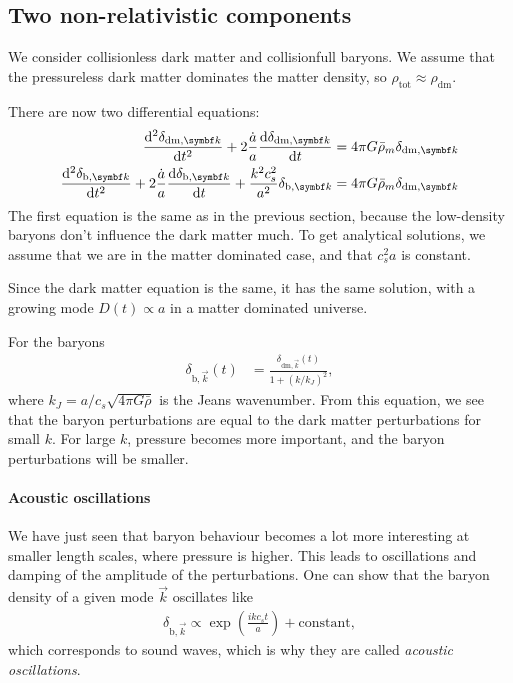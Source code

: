 \subsection{Two non-relativistic components}
We consider collisionless dark matter and collisionfull baryons. We assume that the pressureless dark matter dominates the matter density, so $\rho_\text{tot} \approx \rho_\text{dm}$.

There are now two differential equations:
\begin{align*}
	\dv[2]{\delta_{\text{dm}, \vec{k}}}{t}
	+ 2 \frac{\dot{a}}{a} \dv{\delta_{\text{dm}, \vec{k}}}{t}
	&= 4 \pi G \bar{\rho}_m \delta_{\text{dm}, \vec{k}}\\
	\dv[2]{\delta_{\text{b}, \vec{k}}}{t}
	+ 2 \frac{\dot{a}}{a} \dv{\delta_{\text{b}, \vec{k}}}{t}
	+ \frac{k^2 c_s^2}{a^2} \delta_{\text{b},\vec{k}}
	&= 4 \pi G \bar{\rho}_m \delta_{\text{dm}, \vec{k}}
\end{align*}
The first equation is the same as in the previous section, because the low-density baryons don't influence the dark matter much. To get analytical solutions, we assume that we are in the matter dominated case, and that $c_s^2 a$ is constant.

Since the dark matter equation is the same, it has the same solution, with a growing mode $D(t) \propto a$ in a matter dominated universe.

For the baryons
\begin{align*}
	\delta_{\text{b},\vec{k}}(t)
	&= \frac{\delta_{\text{dm},\vec{k}}(t)}{1 + (k/k_J)^2},
\end{align*}
where $k_J = a/c_s \sqrt{4 \pi G \bar{\rho}}$ is the Jeans wavenumber. From this equation, we see that the baryon perturbations are equal to the dark matter perturbations for small $k$. For large $k$, pressure becomes more important, and the baryon perturbations will be smaller.

\paragraph*{Acoustic oscillations}
We have just seen that baryon behaviour becomes a lot more interesting at smaller length scales, where pressure is higher. This leads to oscillations and damping of the amplitude of the perturbations. One can show that the baryon density of a given mode $\vec{k}$ oscillates like
\begin{align*}
	\delta_{\text{b},\vec{k}} \propto \exp(\frac{i k c_s t}{a}) + \text{constant},
\end{align*}
which corresponds to sound waves, which is why they are called \emph{acoustic oscillations}.


